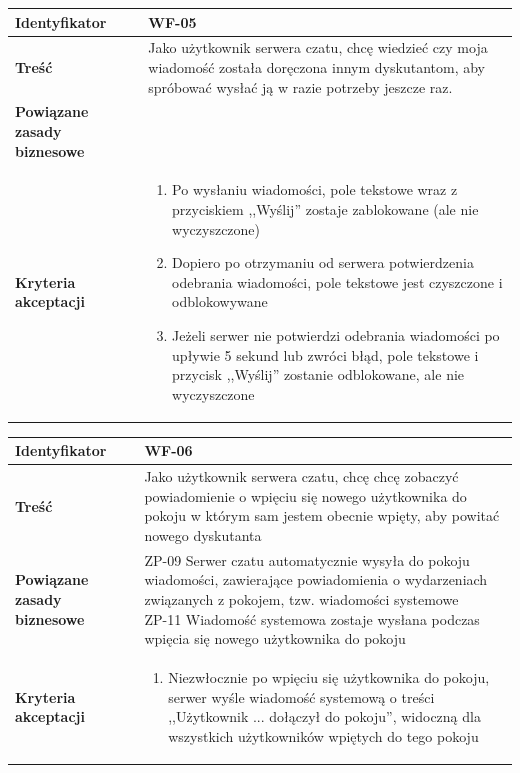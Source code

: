 \documentclass[11pt,oneside,a4paper,titlepage,onecolumn]{article}
\newenvironment{enumreq}
{ \begin{enumerate}[topsep=0pt,itemsep=-1ex,partopsep=1ex,parsep=1ex] }
{ \end{enumerate}                  }
\begin{document}
\begin{tabular}{ | l | l | }
	\hline
		\textbf{Identyfikator} & 
		WF-05
		\\
		
	\hline
		\textbf{Treść} & \parbox[t]{11cm}{
			Jako użytkownik serwera czatu, chcę wiedzieć czy
			moja wiadomość została doręczona innym dyskutantom,
			aby spróbować wysłać ją w razie potrzeby jeszcze raz.
		}\\
		 
	\hline
		\parbox[t]{4cm}{\textbf{Powiązane zasady biznesowe}} & \parbox[t]{11cm}{

		}\\
		
	\hline
		\parbox[t]{4cm}{\textbf{Kryteria akceptacji}} & \parbox[t]{11cm}{
			\begin{enumreq}
				\item Po wysłaniu wiadomości, pole tekstowe wraz 
				z przyciskiem ,,Wyślij'' zostaje zablokowane (ale
				nie wyczyszczone)
				\item Dopiero po otrzymaniu od serwera potwierdzenia
				odebrania wiadomości, pole tekstowe jest czyszczone
				i odblokowywane
				\item Jeżeli serwer nie potwierdzi odebrania
				wiadomości po upływie 5 sekund lub zwróci błąd,
				pole tekstowe i przycisk ,,Wyślij'' zostanie 
				odblokowane, ale nie wyczyszczone
			\end{enumreq}
			}
		\\

	\hline
\end{tabular}

\vspace{2em} 

\begin{tabular}{ | l | l | }
	\hline
		\textbf{Identyfikator} & 
		WF-06
		\\
		
	\hline
		\textbf{Treść} & \parbox[t]{11cm}{
			Jako użytkownik serwera czatu, chcę chcę zobaczyć
			powiadomienie o wpięciu się nowego użytkownika do
			pokoju w którym sam jestem obecnie wpięty, aby powitać
			nowego dyskutanta
		}\\
		 
	\hline
		\parbox[t]{4cm}{\textbf{Powiązane zasady biznesowe}} & \parbox[t]{11cm}{
			ZP-09 Serwer czatu automatycznie wysyła do pokoju
			wiadomości, zawierające powiadomienia o wydarzeniach
			związanych z pokojem, tzw. wiadomości systemowe \\
			ZP-11 Wiadomość systemowa zostaje wysłana podczas
			wpięcia się nowego użytkownika do pokoju
		}\\
		
	\hline
		\parbox[t]{4cm}{\textbf{Kryteria akceptacji}} & \parbox[t]{11cm}{
			\begin{enumreq}
				\item Niezwłocznie po wpięciu się użytkownika do
				pokoju, serwer wyśle wiadomość systemową o treści
				,,Użytkownik ... dołączył do pokoju'', widoczną
				dla wszystkich użytkowników wpiętych do tego pokoju
			\end{enumreq}
			}
		\\

	\hline
\end{tabular}
\end{document}
